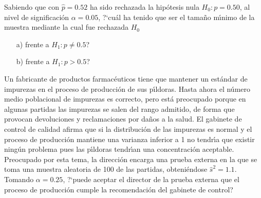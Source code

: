 \begin{prob}%
    Sabiendo que con $\hat{p} = 0.52$ ha sido rechazada la hip\'otesis
    nula $H_{0}: p = 0.50$, al nivel de significaci\'{o}n $\alpha = 0.05$,
    ?`cu\'{a}l ha tenido que ser el tama\~{n}o m\'{\i}nimo de la muestra
    mediante la cual fue rechazada $H_{0}$
    \begin{itemize}
    \item [a)] frente a $H_{1}: p \not = 0.5$?

    \item [b)] frente a $H_{1}: p > 0.5$?
    \end{itemize}
\end{prob}

\begin{prob}%
    Un fabricante de productos farmac\'{e}uticos tiene que mantener un
    est\'andar de impurezas en el proceso de producci\'{o}n de sus
    p\'{\i}ldoras. Hasta ahora el n\'{u}mero medio poblacional de
    impurezas es correcto, pero est\'{a} preocupado porque en algunas
    partidas las impurezas se salen del rango admitido, de forma que
    provocan devoluciones y reclamaciones por da\~{n}os a la salud. El
    gabinete de control de calidad afirma que si la distribuci\'{o}n de
    las impurezas es normal y el proceso de producci\'{o}n mantiene una
    varianza inferior a 1 no tendr\'{\i}a que existir ning\'{u}n problema
    pues las p\'{\i}ldoras tendr\'{\i}an una concentraci\'{o}n aceptable.
    Preocupado por esta tema, la direcci\'{o}n encarga una prueba externa
    en la que se toma una muestra aleatoria de 100 de las partidas,
    obteni\'{e}ndose $\hat{s}^2 = 1.1$. Tomando $\alpha = 0.25$, ?`puede
    aceptar el director de la prueba externa que el proceso de producci\'on
    cumple la recomendaci\'on del gabinete de control?
\end{prob}

